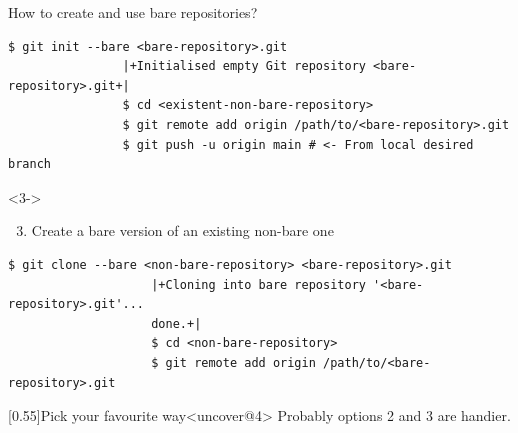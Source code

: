 \documentclass[usenames,svgnames,14pt]{beamer}
\begin{document}
\begin{frame}[fragile]{How to create and use bare repositories?}
\begin{overlayarea}{\textwidth}{0.8\textheight}
\begin{onlyenv}
\begin{lstlisting}[style=MyBash]
                $ git init --bare <bare-repository>.git
                |+Initialised empty Git repository <bare-repository>.git+|
                $ cd <existent-non-bare-repository>
                $ git remote add origin /path/to/<bare-repository>.git
                $ git push -u origin main # <- From local desired branch
            \end{lstlisting}
            \vspace{1mm}
            \begin{uncoverenv}<3->
                \begin{enumerate}
                    \setcounter{enumi}{2}
                    \item Create a bare version of an existing non-bare one
                \end{enumerate}
                \begin{lstlisting}[style=MyBash]
                    $ git clone --bare <non-bare-repository> <bare-repository>.git
                    |+Cloning into bare repository '<bare-repository>.git'...
                    done.+|
                    $ cd <non-bare-repository>
                    $ git remote add origin /path/to/<bare-repository>.git
                \end{lstlisting}
            \end{uncoverenv}
            \vspace{-1mm}
            \begin{varblock}{}[0.55\textwidth]{Pick your favourite way}<uncover@4>
                \small Probably options 2 and 3 are handier.
            \end{varblock}
        \end{onlyenv}
    \end{overlayarea}
\end{frame}


\end{document}
